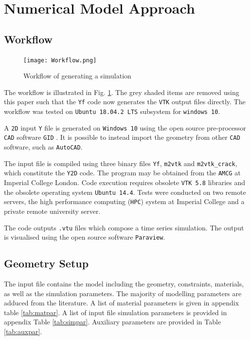 \section{Numerical Model Approach}
\label{sec:NumericalModelApproach}

\subsection{Workflow}
\label{subsec:SoftwareSetup}

\begin{figure}[h!]
    \centering
    \texttt{[image: Workflow.png]}
    \caption{Workflow of generating a simulation}
    \label{fig:workflow}
\end{figure}

The workflow is illustrated in Fig. \ref{fig:workflow}. The grey shaded items are removed using this paper such that the \texttt{Yf} code now generates the \texttt{VTK} output files directly. The workflow was tested on \texttt{Ubuntu 18.04.2 LTS} subsystem for \texttt{windows 10}.

\bigbreak
A \texttt{2D} input \texttt{Y} file is generated on \texttt{Windows 10} using the open source pre-processor \texttt{CAD} software \texttt{GID} \cite{GID11}. It is possible to instead import the geometry from other \texttt{CAD} software, such as \texttt{AutoCAD}.

\bigbreak
The input file is compiled using three binary files \texttt{Yf}, \texttt{m2vtk} and \texttt{m2vtk\_crack}, which constitute the \texttt{Y2D} code. The program may be obtained from the \texttt{AMCG} at Imperial College London. Code execution requires obsolete \texttt{VTK 5.8} libraries and the obsolete operating system \texttt{Ubuntu 14.4}. Tests were conducted on two remote servers, the high performance computing (\texttt{HPC}) system at Imperial College and a private remote university server.

\bigbreak
The code outputs \texttt{.vtu} files which compose a time series simulation. The output is visualised using the open source software \texttt{Paraview}.

\subsection{Geometry Setup}
\label{subsec:GeometrySetup}

The input file contains the model including the geometry, constraints, materials, as well as the simulation parameters. The majority of modelling parameters are adduced from the literature. A list of material parameters is given in appendix table \ref{tab:matpar}. A list of input file simulation parameters is provided in appendix Table \ref{tab:simpar}. Auxiliary parameters are provided in Table \ref{tab:auxpar}.

